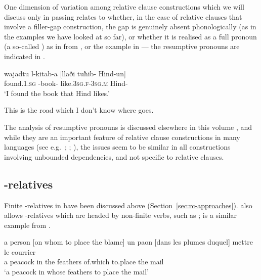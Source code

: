 \documentclass[output=paper
 	        ,biblatex
                ,babelshorthands
                ,newtxmath
                ,draftmode
                ,colorlinks, citecolor=brown
]{langscibook}
\begin{document}
One dimension of variation among relative clause
constructions which we will discuss only in passing relates to whether, in the case of
relative clauses that involve a filler-gap construction, the gap is genuinely absent
phonologically (as in the examples we have looked at so far), or whether it is realised as
a full pronoun (a so-called \emph{}) as in  from
, or the  example in  --- the
resumptive pronouns are indicated in \bolddescriptionintext.
\begin{exe}\ex\label{x:rc-50}
\gll wajadtu    l-kitab-a    [{llaði} tuħib-     Hind-un] \\
     found.\textsc{1.sg} {\DEF-book-\ACC} \hphantom{[}{that.\textsc{sg.m}}   like.\textsc{3sg.f-3sg.m} Hind-\NOM\\
\glt `I found the book that Hind likes.' 
\end{exe}
\begin{exe}\ex\label{x:rc-51}
  This is the road which I don't know where  goes.
\end{exe}
The analysis of resumptive pronouns is discussed elsewhere in this volume , and while they
are an important feature of relative clause constructions in many languages
(see e.g.\ \citealt{Vaillette2001a-u}; \citealt{Vaillette2001b}; \citealt{Taghvaipour:05,AbeilleGodard07,AB2013a-u}), the issues seem to be similar in all
constructions involving unbounded dependencies, and not specific to relative clauses.

\subsection{-relatives}
\label{sec:rc-wh-relatives}

Finite -relatives in  have been discussed above
(Section~\ref{sec:rc-approaches}).  also allows -relatives which are headed by
non-finite verbs, such as ;  is a similar example from .
\begin{exe}
\ex\label{x:rc-52}  a person [on whom to place the blame]
\ex\label{x:rc-53}
\gll un paon                 [dans les plumes duquel]  mettre le courrier\\
     a  peacock \hphantom{[}in the feathers of.which to.place the mail\\
     \glt `a  peacock in whose feathers to place the mail'
\end{exe}
\end{document}
